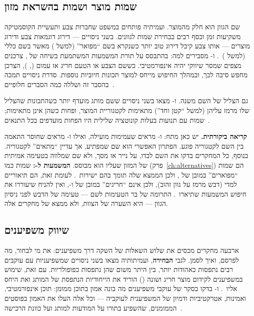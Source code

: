 \subsection{שמות מוצר ושמות בהשראת מזון}
\label{subsec:lit-naming}

שם הגוון הוא חלק מהמוצר.  ועמיתיה פותחים במשפט שחברות צבע
ותעשיית הקוסמטיקה משקיעות זמן וכסף רבים בבחירת שמות לגוונים. בשני ניסויים ---
דירוג דוגמאות צבע ודירוג מוצרים --- אותו צבע קיבל דירוג טוב יותר כשנקרא בשם
``מפואר'' (למשל ) מאשר בשם כללי (למשל )~\cite{skorinko2006rose}.
 ו- מסבירים למה: בהתבסס על תורת המשמעות המשתמעת בשיחה של
, צרכנים מצפים שמסר שיווקי יהיה אינפורמטיבי. כששם הצבע או הטעם
חריג או עמום (, ), הצרכן מחפש סיבה לכך,
ובמהלך החיפוש מייחס למוצר תכונות חיוביות נוספות. סדרת ניסויים תמכה בהסבר זה
ושללה כמה הסברים חלופיים~\cite{miller2005shades}.

גם הצליל של השם משנה.  ו- מצאו בשני ניסויים ששם מותג מועדף
יותר כשהתכונות שהצליל שלו מרמז עליהן (למשל ``קטן וחד'') מתאימות לקטגוריית המוצר,
ופחות כשהן אינן מתאימות; שמות עם תנועות בעלות קונוטציה שלילית היו הפחות מועדפים
בכל התנאים~\cite{lowrey2007phonetic}.

\textbf{קריאה ביקורתית.} יש כאן מתח:  ו- מראים שעמימות
מועילה, ואילו  ו- מראים שחוסר התאמה בין השם לקטגוריה פוגע.
הפתרון האפשרי הוא שם שמפתיע, אך עדיין ``מתאים'' לקטגוריה. בנוסף, כל המחקרים
בדקו את השם לבדו, על נייר או מסך, ולא שם שמלווה בטעימה אמיתית של המזון שעליו
הוא מבוסס. \textbf{המשמעות ל-:} שמות כמו 
(פרק~\ref{ch:alternatives}) הם שמות ``מפוארים'' במובן של , ולכן
הממצא שלה תומך בהם ישירות~\cite{skorinko2006rose}. לעומת זאת, הם תיאוריים
למדי (דבש מרמז על גוון זהוב), ולכן אינם ``חריגים'' במובן של 
ו-, ואין להניח שיעוררו את חיפוש המשמעות שתיארו~\cite{miller2005shades}.
התרומה של בר הטעימות לשם --- טעימה של הדבש לפני ניסיון הגוון --- היא השערה
של הצוות, ולא ממצא של מחקרים אלה.

\subsection{שיווק משפיענים}
\label{subsec:lit-influencers}

ארבעה מחקרים מכסים את שלוש השאלות של השקה דרך משפיענים: את מי לבחור, מה לפרסם,
ואיך לסמן. לגבי \textbf{הבחירה},  ועמיתותיה מצאו בשני ניסויים
שמשפיעניות עם עוקבים רבים נתפסות כאהודות יותר, בין היתר משום שהן נתפסות
כפופולריות. עם זאת, שימוש במשפיענים לקידום מוצר חריג ושונה ()
הוריד את הייחודיות הנתפסת של המותג ואת היחס אליו~\cite{deveirman2017marketing}.
 ו- בדקו בסקר של עוקבי משפיענים מה בונה אמון בתוכן ממומן: תוכן
אינפורמטיבי, ואמינות, אטרקטיביות ודמיון של המשפיענית לעוקביה --- וכל אלה העלו את
האמון בפוסטים הממומנים, שהשפיע בתורו על המודעות למותג ועל כוונת
הרכישה~\cite{lou2019influencer}.

